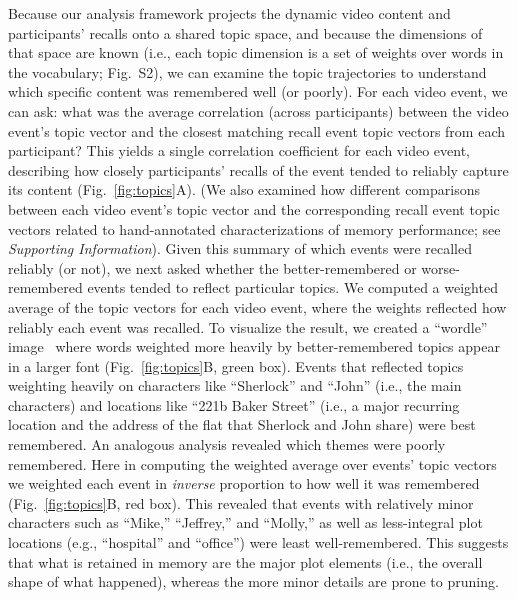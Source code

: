 \documentclass{article}
\newcommand{\topics}{S2}
\begin{document}
Because our analysis framework projects the dynamic video content and participants' recalls onto a shared topic space, and because the dimensions of that space are known (i.e., each topic dimension is a set of weights over words in the vocabulary; Fig.~\topics), we can examine the topic trajectories to understand which specific content was remembered well (or poorly).  For each video event, we can ask: what was the average correlation (across participants) between the video event's topic vector and the closest matching recall event topic vectors from each participant? This yields a single correlation coefficient for each video event, describing how closely participants' recalls of the event tended to reliably capture its content (Fig.~\ref{fig:topics}A).  (We also examined how different comparisons between each video event's topic vector and the corresponding recall event topic vectors related to hand-annotated characterizations of memory performance; see \textit{Supporting Information}).  Given this summary of which events were recalled reliably (or not), we next asked whether the better-remembered or worse-remembered events tended to reflect particular topics.  We computed a weighted average of the topic vectors for each video event, where the weights reflected how reliably each event was recalled.  To visualize the result, we created a ``wordle'' image~\citep{MuelEtal18} where words weighted more heavily by better-remembered topics appear in a larger font (Fig.~\ref{fig:topics}B, green box).  Events that reflected topics weighting heavily on characters like ``Sherlock'' and ``John'' (i.e., the main characters) and locations like ``221b Baker Street'' (i.e., a major recurring location and the address of the flat that Sherlock and John share) were best remembered.  An analogous analysis revealed which themes were poorly remembered.  Here in computing the weighted average over events' topic vectors we weighted each event in \textit{inverse} proportion to how well it was remembered (Fig.~\ref{fig:topics}B, red box).  This revealed that events with relatively minor characters such as ``Mike,'' ``Jeffrey,'' and ``Molly,'' as well as less-integral plot locations (e.g., ``hospital'' and ``office'') were least well-remembered.  This suggests that what is retained in memory are the major plot elements (i.e., the overall shape of what happened), whereas the more minor details are prone to pruning.
\end{document}
